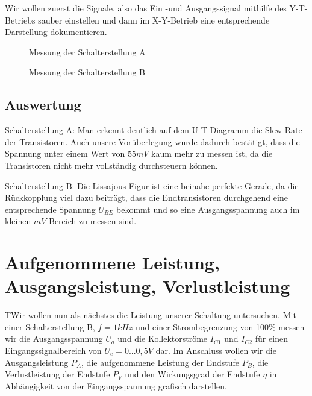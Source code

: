 \documentclass{article}
\begin{document}
Wir wollen zuerst die Signale, also das Ein -und Ausgangssignal mithilfe des Y-T-Betriebs sauber einstellen und dann im X-Y-Betrieb eine entsprechende Darstellung dokumentieren.

\begin{figure}[h]
  \centering

  \caption{Messung der Schalterstellung A}
  \label{fig:schaltAlissa}
\end{figure}

\begin{figure}[h]
  \centering

  \caption{Messung der Schalterstellung B}
  \label{fig:schaltBlissa}
\end{figure}

\subsection{Auswertung}
\label{sec:auswertung-1}

Schalterstellung A: Man erkennt deutlich auf dem U-T-Diagramm die Slew-Rate der Transistoren. Auch unsere
Vorüberlegung wurde dadurch bestätigt, dass die Spannung unter einem Wert von $55mV$ kaum mehr zu messen ist, da
die Transistoren nicht mehr vollständig durchsteuern können.

Schalterstellung B: Die Lissajous-Figur ist eine beinahe perfekte Gerade, da die Rückkopplung viel dazu beiträgt, dass die Endtransistoren
durchgehend eine entsprechende Spannung $U_{BE}$ bekommt und so eine Ausgangsspannung auch im kleinen $mV$-Bereich zu messen sind.

\newpage
\section{Aufgenommene Leistung, Ausgangsleistung, Verlustleistung}
\label{sec:aufg-leist-ausg}

\begin{task}
  TWir wollen nun als nächstes die Leistung unserer Schaltung untersuchen. Mit einer Schalterstellung B, $f=1kHz$ und einer Strombegrenzung von 100\% messen wir die Ausgangsspannung $U_{a}$ und die Kollektorströme $I_{C1}$ und $I_{C2}$ für einen Eingangssignalbereich von $U_{e} = 0...0,5V$ dar. Im Anschluss wollen wir die Ausgangsleistung $P_{A}$, die aufgenommene Leistung der Endstufe $P_{B}$, die Verlustleistung der Endstufe $P_{V}$ und den Wirkungsgrad der Endstufe $\eta$ in Abhängigkeit von der Eingangsspannung grafisch darstellen.
\end{task}
\end{document}
